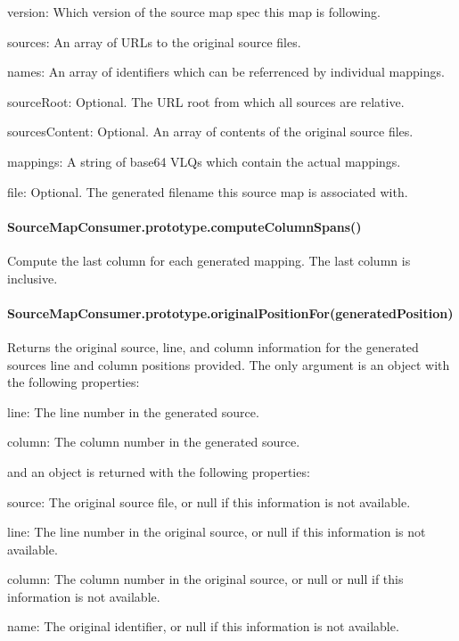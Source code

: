 \begin{DoxyItemize}
\item {\ttfamily version}\+: Which version of the source map spec this map is following.
\item {\ttfamily sources}\+: An array of U\+R\+Ls to the original source files.
\item {\ttfamily names}\+: An array of identifiers which can be referrenced by individual mappings.
\item {\ttfamily source\+Root}\+: Optional. The U\+R\+L root from which all sources are relative.
\item {\ttfamily sources\+Content}\+: Optional. An array of contents of the original source files.
\item {\ttfamily mappings}\+: A string of base64 V\+L\+Qs which contain the actual mappings.
\item {\ttfamily file}\+: Optional. The generated filename this source map is associated with.
\end{DoxyItemize}

\paragraph*{Source\+Map\+Consumer.\+prototype.\+compute\+Column\+Spans()}

Compute the last column for each generated mapping. The last column is inclusive.

\paragraph*{Source\+Map\+Consumer.\+prototype.\+original\+Position\+For(generated\+Position)}

Returns the original source, line, and column information for the generated source\textquotesingle{}s line and column positions provided. The only argument is an object with the following properties\+:


\begin{DoxyItemize}
\item {\ttfamily line}\+: The line number in the generated source.
\item {\ttfamily column}\+: The column number in the generated source.
\end{DoxyItemize}

and an object is returned with the following properties\+:


\begin{DoxyItemize}
\item {\ttfamily source}\+: The original source file, or null if this information is not available.
\item {\ttfamily line}\+: The line number in the original source, or null if this information is not available.
\item {\ttfamily column}\+: The column number in the original source, or null or null if this information is not available.
\item {\ttfamily name}\+: The original identifier, or null if this information is not available.
\end{DoxyItemize}

